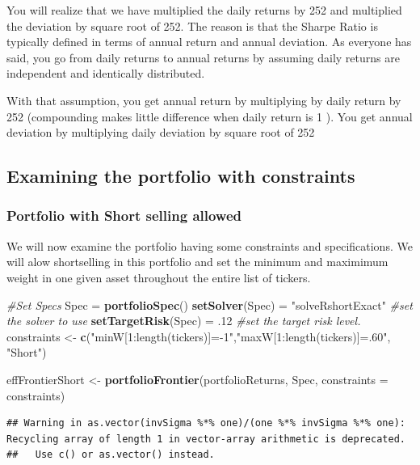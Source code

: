 \documentclass[]{article}
\newenvironment{Shaded}{\begin{snugshade}}{\end{snugshade}}
\newcommand{\KeywordTok}[1]{\textcolor[rgb]{0.13,0.29,0.53}{\textbf{#1}}}
\newcommand{\DataTypeTok}[1]{\textcolor[rgb]{0.13,0.29,0.53}{#1}}
\newcommand{\DecValTok}[1]{\textcolor[rgb]{0.00,0.00,0.81}{#1}}
\newcommand{\StringTok}[1]{\textcolor[rgb]{0.31,0.60,0.02}{#1}}
\newcommand{\CommentTok}[1]{\textcolor[rgb]{0.56,0.35,0.01}{\textit{#1}}}
\newcommand{\NormalTok}[1]{#1}
\begin{document}
You will realize that we have multiplied the daily returns by 252 and
multiplied the deviation by square root of 252. The reason is that the
Sharpe Ratio is typically defined in terms of annual return and annual
deviation. As everyone has said, you go from daily returns to annual
returns by assuming daily returns are independent and identically
distributed.

With that assumption, you get annual return by multiplying by daily
return by 252 (compounding makes little difference when daily return is
1 ). You get annual deviation by multiplying daily deviation by square
root of 252

\subsection{Examining the portfolio with
constraints}\label{examining-the-portfolio-with-constraints}

\subsubsection{Portfolio with Short selling
allowed}\label{portfolio-with-short-selling-allowed}

We will now examine the portfolio having some constraints and
specifications. We will alow shortselling in this portfolio and set the
minimum and maximimum weight in one given asset throughout the entire
list of tickers.

\begin{Shaded}
\begin{Highlighting}[]
\CommentTok{#Set Specs}
\NormalTok{Spec =}\StringTok{ }\KeywordTok{portfolioSpec}\NormalTok{()}
\KeywordTok{setSolver}\NormalTok{(Spec) =}\StringTok{ "solveRshortExact"} \CommentTok{#set the solver to use}
\KeywordTok{setTargetRisk}\NormalTok{(Spec) =}\StringTok{ }\NormalTok{.}\DecValTok{12} \CommentTok{#set the target risk level.}
\NormalTok{constraints <-}\StringTok{ }\KeywordTok{c}\NormalTok{(}\StringTok{"minW[1:length(tickers)]=-1"}\NormalTok{,}\StringTok{"maxW[1:length(tickers)]=.60"}\NormalTok{, }\StringTok{"Short"}\NormalTok{)}
 
\NormalTok{effFrontierShort <-}\StringTok{ }\KeywordTok{portfolioFrontier}\NormalTok{(portfolioReturns, Spec, }\DataTypeTok{constraints =}\NormalTok{ constraints)}
\end{Highlighting}
\end{Shaded}

\begin{verbatim}
## Warning in as.vector(invSigma %*% one)/(one %*% invSigma %*% one): Recycling array of length 1 in vector-array arithmetic is deprecated.
##   Use c() or as.vector() instead.
\end{verbatim}
\end{document}
